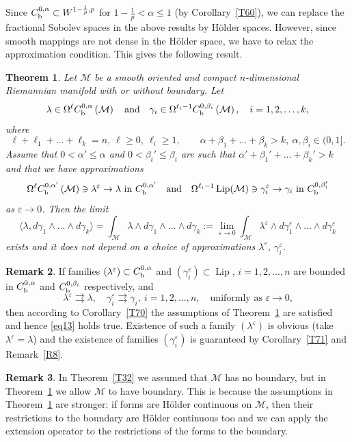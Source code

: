 \documentclass[intlimits,12pt,reqno]{amsart}
\newcommand{\cM}{\mathcal M}
\newcommand{\eps}{\varepsilon}
\numberwithin{equation}{section}
\def\lip{\operatorname{Lip}}
\newtheorem{theorem}{Theorem}[section]
\theoremstyle{definition}
\newtheorem{remark}[theorem]{Remark}
\begin{document}
Since $C_{\rm b}^{0,\alpha}\subset W^{1-\frac{1}{p},p}$ for $1-\frac{1}{p}<\alpha\leq 1$ (by Corollary~\ref{T60}), we can replace the fractional Sobolev spaces in 
the above results by H\"older spaces. However, since smooth mappings are not dense in the H\"older space, we have to relax the approximation condition. This gives the following result.
\begin{theorem}
\label{T34}
Let $\cM$ be a smooth oriented and compact $n$-dimensional Riemannian manifold with or without boundary. Let
$$
\lambda\in \Omega^\ell C_{\rm b}^{0,\alpha}\left(\cM\right)
\quad
\text{and}
\quad
\gamma_i\in \Omega^{\ell_i-1}C_{\rm b}^{0,\beta_i}\left(\cM\right),
\quad
i=1,2,\ldots,k,
$$
where 
$$
\ell+\ell_1+\ldots+\ell_k=n,\
\ell\geq 0,\ \ell_i\geq 1, 
\qquad
\alpha+\beta_1+\ldots+\beta_k>k,\ \alpha,\beta_i\in (0,1].
$$
Assume that $0<\alpha'\leq\alpha$ and $0<\beta_i'\leq\beta_i$ are such that
$\alpha'+\beta_1'+\ldots+\beta_k'>k$ and that
we have approximations
$$
\Omega^\ell C_{\rm b}^{0,\alpha'}\left(\cM\right)\ni\lambda^\eps\to\lambda\ \text{in $C_{\rm b}^{0,\alpha'}$}
\quad
\text{and}
\quad
\Omega^{\ell_i-1}\lip(\cM)\ni \gamma_i^\eps\to \gamma_i\ \text{in $C_{\rm b}^{0,\beta_i'}$}
$$
as $\eps\to 0$. Then the limit
\begin{equation}
\label{eq13}
\langle \lambda,d\gamma_1\wedge\ldots\wedge d\gamma_k\rangle=
\int_{\cM}\lambda\wedge d\gamma_1\wedge\ldots\wedge d\gamma_{k}:=
\lim_{\eps\to 0}\int_{\cM} \lambda^\eps\wedge d\gamma_1^\eps\wedge\ldots\wedge d\gamma_k^\eps
\end{equation}
exists and it does not depend on a choice of approximations $\lambda^\eps$, $\gamma_i^\eps$.
\end{theorem}
\begin{remark}
If families $(\lambda^\eps)\subset C_{\rm b}^{0,\alpha}$ and $(\gamma_i^\eps)\subset \lip$, $i=1,2,\ldots,n$ are bounded in $C_{\rm b}^{0,\alpha}$ and $C_{\rm b}^{0,\beta_i}$ respectively, and
$$
\lambda^\eps\rightrightarrows\lambda,
\quad
\gamma_i^\eps\rightrightarrows\gamma_i, \ i=1,2,\ldots,n,
\quad
\text{uniformly as $\eps\to 0$,}
$$
then according to Corollary~\ref{T70} the assumptions of Theorem~\ref{T34} are satisfied and hence \eqref{eq13} holds true. Existence of such a family $(\lambda^\eps)$ is obvious (take $\lambda^\eps=\lambda$) and the existence of families $(\gamma_i^\eps)$ is guaranteed by Corollary~\ref{T71} and Remark~\ref{R8}.
\end{remark}
\begin{remark}
In Theorem~\ref{T32} we assumed that $\cM$ has no boundary, but in Theorem~\ref{T34} we allow $\cM$ to have boundary. This is because the assumptions in Theorem~\ref{T34} are stronger: if forms are H\"older continuous on $\cM$, then their restrictions to the boundary are H\"older continuous too and we can apply the extension operator to the restrictions of the forms to the boundary.
\end{remark}
\end{document}
